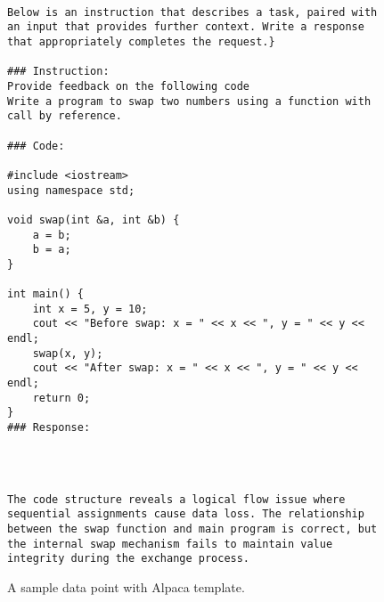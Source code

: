 \begin{figure}[!t]
    \centering

\begin{lstlisting}

Below is an instruction that describes a task, paired with an input that provides further context. Write a response that appropriately completes the request.}

### Instruction:
Provide feedback on the following code
Write a program to swap two numbers using a function with call by reference.

### Code:

#include <iostream>
using namespace std;

void swap(int &a, int &b) {
    a = b;
    b = a;
}

int main() {
    int x = 5, y = 10;
    cout << "Before swap: x = " << x << ", y = " << y << endl;
    swap(x, y);
    cout << "After swap: x = " << x << ", y = " << y << endl;
    return 0;
}
### Response:




\end{lstlisting}

\begin{lstlisting}
The code structure reveals a logical flow issue where sequential assignments cause data loss. The relationship between the swap function and main program is correct, but the internal swap mechanism fails to maintain value integrity during the exchange process.

\end{lstlisting}

    \caption{A sample data point with Alpaca template.}
    \label{fig:sample-data}
\end{figure}









\par






